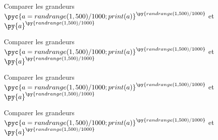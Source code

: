 \documentclass{exos}
\begin{document}
\begin{exercize}
\hfill
\begin{alphaquestions}
\item Comparer les grandeurs $\pyc{a = randrange(1,500)/1000; print(a)}^{\py{randrange(1,500)/1000}}$ et $\py{a}^{\py{randrange(1,500)/1000}}$
\item Comparer les grandeurs $\pyc{a = randrange(1,500)/1000; print(a)}^{\py{randrange(1,500)/1000}}$ et $\py{a}^{\py{randrange(1,500)/1000}}$
\item Comparer les grandeurs $\pyc{a = randrange(1,500)/1000; print(a)}^{\py{randrange(1,500)/1000}}$ et $\py{a}^{\py{randrange(1,500)/1000}}$
\item Comparer les grandeurs $\pyc{a = randrange(1,500)/1000; print(a)}^{\py{randrange(1,500)/1000}}$ et $\py{a}^{\py{randrange(1,500)/1000}}$
\end{alphaquestions}
\end{exercize}
\end{document}
